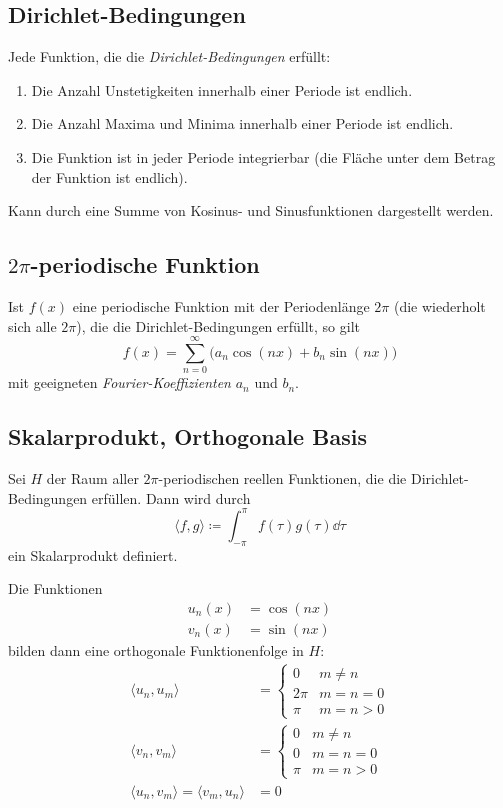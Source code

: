 		\subsection{Dirichlet-Bedingungen}
			Jede Funktion, die die \emph{Dirichlet-Bedingungen} erfüllt:
			\begin{enumerate}
				\item Die Anzahl Unstetigkeiten innerhalb einer Periode ist endlich.
				\item Die Anzahl Maxima und Minima innerhalb einer Periode ist endlich.
				\item Die Funktion ist in jeder Periode integrierbar (\dh die Fläche unter dem Betrag der Funktion ist endlich).
			\end{enumerate}
			Kann durch eine Summe von Kosinus- und Sinusfunktionen dargestellt werden.

		\subsection{\(2\pi\)-periodische Funktion}
			Ist \( f(x) \) eine periodische Funktion mit der Periodenlänge \( 2\pi \) (\dh die wiederholt sich alle \(2\pi\)), die die Dirichlet-Bedingungen erfüllt, so gilt
			\begin{equation*}
				f(x) = \sum_{n = 0}^{\infty} \big( a_n \cos(nx) + b_n \sin(nx) \big)
			\end{equation*}
			mit geeigneten \emph{Fourier-Koeffizienten} \( a_n \) und \( b_n \).

		\subsection{Skalarprodukt, Orthogonale Basis}
			Sei \(H\) der Raum aller \(2\pi\)-periodischen reellen Funktionen, die die Dirichlet-Bedingungen erfüllen. Dann wird durch
			\begin{equation*}
				\langle f, g \rangle \coloneqq \int_{-\pi}^{\pi} \! f(\tau) g(\tau) \dd{\tau}
			\end{equation*}
			ein Skalarprodukt definiert.
			
			Die Funktionen
			\begin{align*}
				u_n(x) &= \cos(nx) \\
				v_n(x) &= \sin(nx)
			\end{align*}
			bilden dann eine orthogonale Funktionenfolge in \(H\):
			\begin{align*}
				\langle u_n, u_m \rangle &=
					\begin{cases}
						0    & m \neq n  \\
						2\pi & m = n = 0 \\
						\pi  & m = n > 0
					\end{cases} \\
				\langle v_n, v_m \rangle &=
					\begin{cases}
						0   & m \neq n  \\
						0   & m = n = 0 \\
						\pi & m = n > 0
					\end{cases} \\
				\langle u_n, v_m \rangle = \langle v_m, u_n \rangle &= 0
			\end{align*}
			
